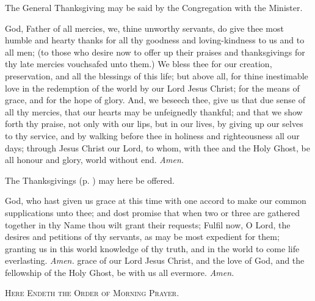 \begin{rubric}
    The General Thanksgiving may be said by the Congregation with the Minister.
\end{rubric}
 God, Father of all mercies, we, thine unworthy servants, do give thee most humble and hearty thanks for all thy goodness and loving-kindness to us and to all men; (to those who desire now to offer up their praises and thanksgivings for thy late mercies vouchsafed unto them.) We bless thee for our creation, preservation, and all the blessings of this life; but above all, for thine inestimable love in the redemption of the world by our Lord Jesus Christ; for the means of grace, and for the hope of glory. And, we beseech thee, give us that due sense of all thy mercies, that our hearts may be unfeignedly thankful; and that we show forth thy praise, not only with our lips, but in our lives, by giving up our selves to thy service, and by walking before thee in holiness and righteousness all our days; through Jesus Christ our Lord, to whom, with thee and the Holy Ghost, be all honour and glory, world without end. \textit{Amen.}
\begin{rubric}
    The Thanksgivings (p. \pageref{thanksgiving}) may here be offered.
\end{rubric}
\vspace{-2ex}
 God, who hast given us grace at this time with one accord to make our common supplications unto thee; and dost promise that when two or three are gathered together in thy Name thou wilt grant their requests; Fulfil now, O Lord, the desires and petitions of thy servants, as may be most expedient for them; granting us in this world knowledge of thy truth, and in the world to come life everlasting. \textit{Amen.}
 grace of our Lord Jesus Christ, {} and the love of God, and the fellowship of the Holy Ghost, be with us all evermore. \textit{Amen.}\par
\begin{center}
    \textsc{Here Endeth the Order of Morning Prayer.}
\end{center}